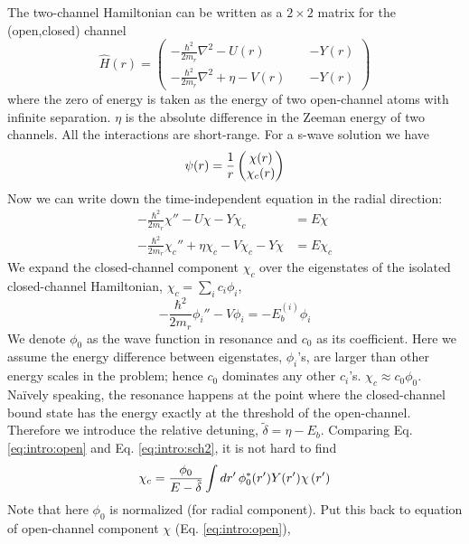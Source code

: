 The two-channel Hamiltonian can be written as a $2\times2$ matrix for  the (open,closed) channel
\begin{equation}\label{eq:intro:ham}
\hat{H}(r)=
\begin{pmatrix}
-\frac{\hbar^{2}}{2m_{r}}\nabla^{2}-U(r)&\;&-Y(r)\\
-\frac{\hbar^{2}}{2m_{r}}\nabla^{2}+\eta-V(r)&\;&-Y(r)
\end{pmatrix}
\end{equation}
where the  zero of energy is taken as the energy of two open-channel atoms with infinite separation. $\eta$ is the absolute difference in the Zeeman energy of two channels.  All the interactions are short-range.  For a s-wave solution we have 
\begin{equation}
\psi(r)=\frac{1}{r}\begin{pmatrix}\chi(r)\\\chi_{c}(r)\end{pmatrix}
\end{equation}
Now we can write down the time-independent \sch equation in the radial direction:
\begin{align}
-\frac{\hbar^{2}}{2m_{r}}\chi''-U\chi-Y\chi_c&=E\chi\label{eq:intro:open}\\
-\frac{\hbar^{2}}{2m_{r}}\chi_c''+\eta\chi_c-V\chi_c-Y\chi&=E\chi_c\label{eq:intro:close}
\end{align}
We expand the closed-channel component $\chi_{c}$ over the eigenstates of the isolated closed-channel Hamiltonian, $\chi_{c}=\sum_{i}c_{i}\phi_{i}$, 
\begin{equation}\label{eq:intro:sch2}
-\frac{\hbar^{2}}{2m_{r}}\phi_{i}''-V \phi_{i}=-E_{b}^{(i)}\phi_{i}
\end{equation}
We denote $\phi_{0}$ as the wave function  in resonance and $c_{0}$ as its coefficient.  Here we assume the energy difference between eigenstates, $\phi_{i}$'s, are larger than other energy scales in the problem; hence $c_{0}$ dominates any other $c_{i}$'s.  $\chi_{c}\approx{}c_{0}\phi_{0}$.  Na\"{i}vely speaking, the resonance happens at the point where the closed-channel bound state has the energy exactly at the threshold of the open-channel.  Therefore we introduce the relative detuning, $\tilde\delta=\eta-E_{b}$. Comparing Eq. \ref{eq:intro:open} and Eq. \ref{eq:intro:sch2}, it is not hard to find
\begin{equation}\label{eq:intro:closeCoeff}
\chi_{c}=\frac{\phi_{0}}{E-\tilde\delta}\int{dr'}\,\phi_{0}^{*}(r')Y(r')\chi\left(r'\right)
\end{equation}
Note that here $\phi_{0}$ is normalized (for radial component).  Put this back to \sch equation of open-channel component $\chi$ (Eq. \ref{eq:intro:open}), 
